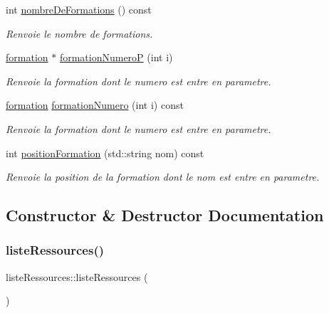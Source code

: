 \begin{DoxyCompactItemize}
int \hyperlink{classliste_ressources_a332aca734617587a463197043a058b02}{nombre\+De\+Formations} () const
\begin{DoxyCompactList}\small\item\em Renvoie le nombre de formations. \end{DoxyCompactList}\item 
\hyperlink{classformation}{formation} $\ast$ \hyperlink{classliste_ressources_a71ef69325d349c087c995f5aac9b9f27}{formation\+NumeroP} (int i)
\begin{DoxyCompactList}\small\item\em Renvoie la formation dont le numero est entre en parametre. \end{DoxyCompactList}\item 
\hyperlink{classformation}{formation} \hyperlink{classliste_ressources_aa0dc7c74caa61d02294c51fb79f7abe7}{formation\+Numero} (int i) const
\begin{DoxyCompactList}\small\item\em Renvoie la formation dont le numero est entre en parametre. \end{DoxyCompactList}\item 
int \hyperlink{classliste_ressources_a1649d1144f57339c52731acf2d5cfa51}{position\+Formation} (std\+::string nom) const
\begin{DoxyCompactList}\small\item\em Renvoie la position de la formation dont le nom est entre en parametre. \end{DoxyCompactList}\end{DoxyCompactItemize}


\subsection{Constructor \& Destructor Documentation}
\hypertarget{classliste_ressources_a3f49a0916898d200295e0e6593253e73}{}\label{classliste_ressources_a3f49a0916898d200295e0e6593253e73} 
\subsubsection{\texorpdfstring{liste\+Ressources()}{listeRessources()}}
{\footnotesize\ttfamily liste\+Ressources\+::liste\+Ressources (\begin{DoxyParamCaption}{ }\end{DoxyParamCaption})}




